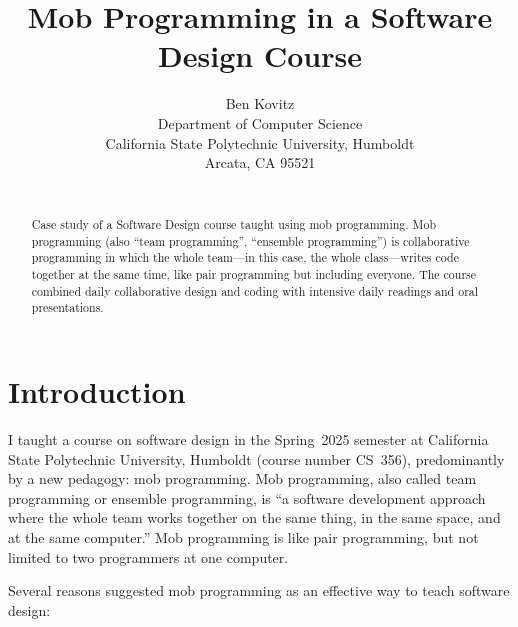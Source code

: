 \documentclass{article}
\title{Mob Programming in a Software Design Course}
\author{
Ben Kovitz \\
Department of Computer Science \\
California State Polytechnic University, Humboldt \\
Arcata, CA 95521 \\
\email{blk14@humboldt.edu}\\
}
\begin{document}
\maketitle

\begin{abstract}
Case study of a Software Design course taught using mob programming. Mob
programming (also ``team programming'', ``ensemble programming'') is
collaborative programming in which the whole team---in this case, the
whole class---writes code together at the same time, like pair programming
but including everyone. The course combined daily collaborative design and
coding with intensive daily readings and oral presentations. %
\end{abstract}

\section{Introduction}
I taught a course on software design in the Spring~2025 semester at
California State Polytechnic University, Humboldt (course number CS~356),
predominantly by a new pedagogy: mob programming. Mob programming,
also called team programming or ensemble programming, is ``a software
development approach where the whole team works together on the same thing,
in the same space, and at the same computer.'' \cite{zuill2022software}
Mob programming is like pair programming, but not limited to two programmers
at one computer.

Several reasons suggested mob programming as an effective way to teach
software design:
\end{document}
